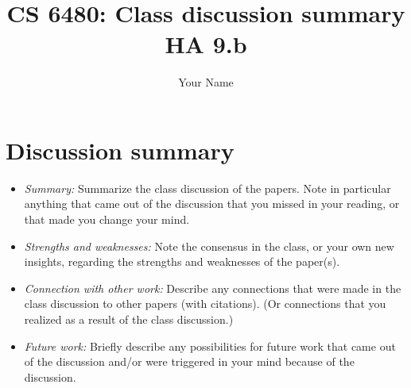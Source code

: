 \documentclass[letterpaper,twocolumn,10pt]{article}
\title{CS 6480: Class discussion summary\\
HA 9.b\\}
\author{Your Name}
\affil{School of Computing, University of Utah}
\begin{document}
\maketitle
\section*{Discussion summary}

\begin{itemize}

\item {\it Summary:} Summarize the class discussion of the papers. Note in
particular anything that came out of the discussion that you missed in your
reading, or that made you change your mind. 

\item {\it Strengths and weaknesses:} Note the consensus
in the class, or your own new insights, regarding the strengths and
weaknesses of the paper(s).

\item {\it Connection with other work:} Describe any connections that were made in
the class discussion to other papers (with citations). (Or connections that you realized
as a result of the class discussion.)

\item {\it Future work:} Briefly describe any possibilities
for future work that came out of the discussion and/or were triggered
in your mind because of the discussion.

\end{itemize}
{
  \small 
  
  
}
\end{document}
